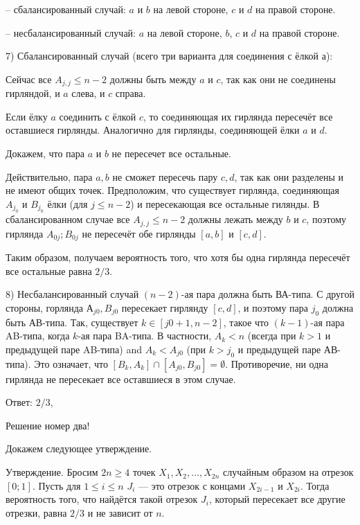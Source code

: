\documentclass[nobib]{tufte-handout}
\theoremstyle{definition}
\newcounter{problem}
\newenvironment{problem}%
{%
\refstepcounter{problem}%
     \hypertarget{problem:{\theproblem}}{}
     \Writetofile{solution_file}{\protect\hypertarget{soln:\theproblem}{}}
     \begin{myenum}[label=\bfseries\protect\hyperlink{soln:\theproblem}{\theproblem},ref=\theproblem]
     \item%
    }%
    {%
    \end{myenum}}
\begin{document}
\begin{problem}
\begin{sol}
– сбалансированный случай: $a$ и $b$ на левой стороне, $c$ и $d$ на правой стороне.

– несбалансированный случай: $a$ на левой стороне, $b$, $c$ и $d$ на правой стороне.

7) Сбалансированный случай (всего три варианта для соединения с ёлкой $а$):

Сейчас все $A_{j, j} \leq n-2$ должны быть между $a$ и $c$, так как они не соединены гирляндой, и $a$ слева, и $c$ справа.

Если ёлку $a$ соединить с ёлкой $c$, то соединяющая их гирлянда пересечёт все оставшиеся гирлянды. Аналогично для гирлянды, соединяющей ёлки $a$ и $d$.

Докажем, что пара $a$ и $b$ не пересечет все остальные.

Действительно, пара $a,b$ не сможет пересечь пару $c,d$, так как они разделены и не имеют общих точек. Предположим, что существует гирлянда, соединяющая $A_{j_0}$ и $B_{j_0}$ ёлки (для $j\leq n-2$) и пересекающая все остальные гилянды. В сбалансированном случае все $A_{j, j} \leq n-2$ должны лежать между $b$ и $c$, поэтому гирлянда $A_{0j};B_{0j}$ не пересечёт обе гирлянды $[a,b]$ и $[c,d]$.

Таким образом, получаем вероятность того, что хотя бы одна гирлянда пересечёт все остальные равна $2/3$.

8) Несбалансированный случай
$(n-2)$-ая пара должна быть ВА-типа. С другой стороны, горлянда $А_{j0},B_{j0}$ пересекает гирлянду $[c,d]$, и поэтому пара $j_0$ должна быть АВ-типа. Так, существует $k \in [j0 + 1, n − 2]$, такое что $(k − 1)$-ая пара AB-типа, когда $k$-ая пара BA-типа. В частности, $A_k < n$ (всегда при $k> 1$ и предыдущей паре AB-типа) and $A_k < A_{j0}$ (при $k > j_0$ и предыдущей паре АВ-типа). Это означает, что $[B_k, A_k] \cap [A_{j0}, B_{j0}]=\emptyset$. Противоречие, ни одна гирлянда не пересекает все оставшиеся в этом случае.

Ответ: $2/3$, \autocite{gravner20problems}

Решение номер два!

Докажем следующее утверждение.

Утверждение. Бросим $2n \geq 4$ точек $X_1, X_2, \ldots, X_{2n}$ случайным образом на отрезок $[0;1]$. Пусть для $1 \leq i \leq n$ $J_i$ — это отрезок с концами $X_{2i-1}$ и $X_{2i}$.
Тогда вероятность того, что найдётся такой отрезок $J_i$, который пересекает все другие отрезки, равна $2/3$ и не зависит от $n$.


\end{sol}
\end{problem}
\end{document}
